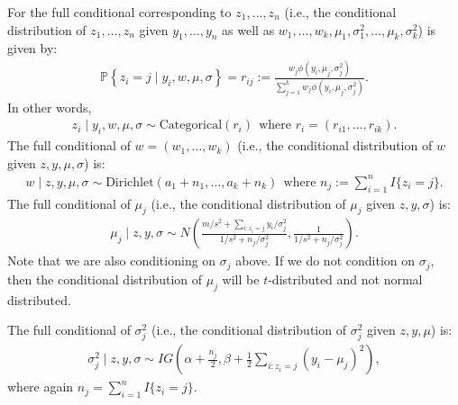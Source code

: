 \documentclass{scrartcl}
\renewcommand{\P}{{\mathbb P}}
\begin{document}
For the full conditional corresponding to $z_1, \dots, z_n$ (i.e., the
conditional distribution of $z_1, \dots, z_n$ given $y_1, \dots, y_n$
as well as $w_1, \dots, w_k, \mu_1, \sigma_1^2, \dots, \mu_k,
\sigma_k^2$) is given by:
\begin{align*}
  \P \left\{z_i = j \mid y_i, w, \mu, \sigma \right\} = r_{ij} := \frac{w_j
  \phi(y_i, \mu_j, \sigma_j^2)}{\sum_{j=1}^k w_j
  \phi(y_i, \mu_j, \sigma_j^2)}. 
\end{align*}
In other words,
\begin{align*}
  z_i \mid y_i, w, \mu, \sigma \sim \text{Categorical}(r_i) ~~
  \text{where $r_i = (r_{i1}, \dots, r_{ik})$}. 
\end{align*}
The full conditional of $w = (w_1, \dots, w_k)$ (i.e., the conditional
distribution of $w$ given $z, y, \mu, \sigma$) is:
\begin{align*}
  w \mid z, y, \mu, \sigma \sim \text{Dirichlet}(a_1 + n_1, \dots, a_k
  + n_k) ~~ \text{where $n_j := \sum_{i=1}^n I\{z_i = j\}$}. 
\end{align*}
The full conditional of $\mu_j$ (i.e., the conditional distribution of
$\mu_j$ given $z, y, \sigma$) is:
\begin{align*}
  \mu_j \mid z, y, \sigma \sim N \left(\frac{m/s^2 + \sum_{i : z_i =
  j} y_i/\sigma_j^2}{1/s^2 + n_j/\sigma_j^2}, \frac{1}{1/s^2 +
  n_j/\sigma_j^2} \right). 
\end{align*}
Note that we are also conditioning on $\sigma_j$ above. If we do not
condition on $\sigma_j$, then the conditional distribution of
$\mu_j$ will be $t$-distributed and not normal distributed. 

The full conditional of $\sigma_j^2$  (i.e., the conditional
distribution of $\sigma_j^2$ given $z, y, \mu$) is:
\begin{align*}
  \sigma_j^2 \mid z, y, \sigma \sim IG \left(\alpha + \frac{n_j}{2},
  \beta + \frac{1}{2} \sum_{i : z_i = j} (y_i - \mu_j)^2 \right), 
\end{align*}
where again $n_j = \sum_{i=1}^n I\{z_i = j\}$.
\end{document}
